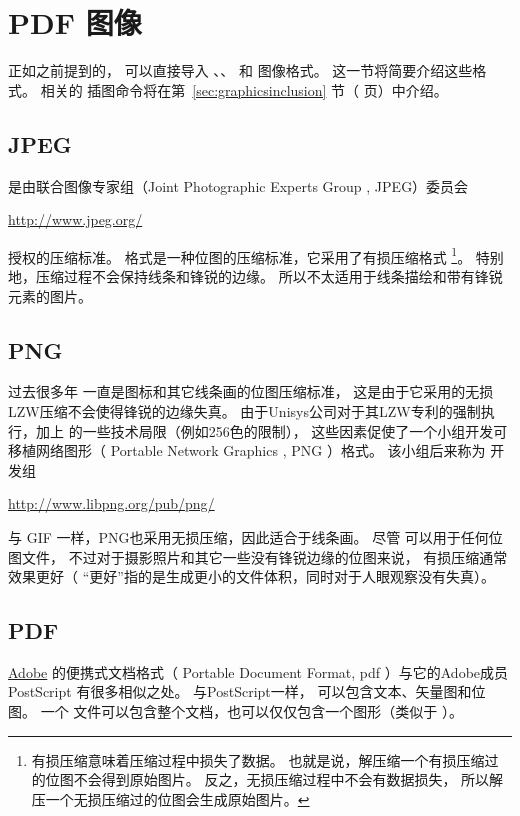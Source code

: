 \section{PDF 图像}\label{sec:pdfgraphics}
正如之前提到的，\pdfTeX{} 可以直接导入 、、 和  图像格式。
这一节将简要介绍这些格式。
相关的\pdfTeX{} 插图命令将在第~\ref{sec:graphicsinclusion} 节（\pageref{sec:graphicsinclusion} 页）中介绍。

\subsection{JPEG}\label{ssec:jpeg}
 是由联合图像专家组（Joint Photographic Experts Group , JPEG）委员会
\begin{center}
	\url{http://www.jpeg.org/}
\end{center}
授权的压缩标准。
 格式是一种位图的压缩标准，它采用了有损压缩格式
\footnote{有损压缩意味着压缩过程中损失了数据。
	也就是说，解压缩一个有损压缩过的位图不会得到原始图片。
	反之，无损压缩过程中不会有数据损失，
	所以解压一个无损压缩过的位图会生成原始图片。}。
特别地，压缩过程不会保持线条和锋锐的边缘。
所以不太适用于线条描绘和带有锋锐元素的图片。

\subsection{PNG}\label{ssec:png}
过去很多年  一直是图标和其它线条画的位图压缩标准，
这是由于它采用的无损LZW压缩不会使得锋锐的边缘失真。
由于Unisys公司对于其LZW专利的强制执行，加上 的一些技术局限（例如256色的限制），
这些因素促使了一个小组开发可移植网络图形（ Portable Network Graphics , PNG ）格式。
该小组后来称为  开发组
\begin{center}
\url{http://www.libpng.org/pub/png/}
\end{center}
与 GIF 一样，PNG也采用无损压缩，因此适合于线条画。
尽管  可以用于任何位图文件，
不过对于摄影照片和其它一些没有锋锐边缘的位图来说，
 有损压缩通常效果更好（ “更好”指的是生成更小的文件体积，同时对于人眼观察没有失真）。

\subsection{PDF}\label{ssec:pdf}
\href{http://www.adobe.com}{Adobe} 的便携式文档格式（ Portable Document Format, pdf ）与它的Adobe成员 PostScript 有很多相似之处。
与PostScript一样， 可以包含文本、矢量图和位图。
一个  文件可以包含整个文档，也可以仅仅包含一个图形（类似于  ）。

